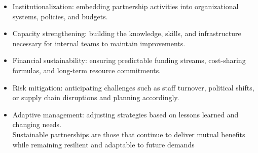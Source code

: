 \documentclass[10pt]{article}
\begin{document}
\begin{itemize}
  \item Institutionalization: embedding partnership activities into organizational systems, policies, and budgets.
  \item Capacity strengthening: building the knowledge, skills, and infrastructure necessary for internal teams to maintain improvements.
  \item Financial sustainability: ensuring predictable funding streams, cost-sharing formulas, and long-term resource commitments.
  \item Risk mitigation: anticipating challenges such as staff turnover, political shifts, or supply chain disruptions and planning accordingly.
  \item Adaptive management: adjusting strategies based on lessons learned and changing needs.\\
Sustainable partnerships are those that continue to deliver mutual benefits while remaining resilient and adaptable to future demands
\end{itemize}
\end{document}
